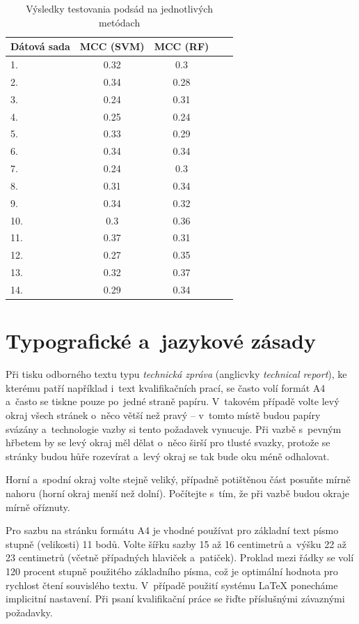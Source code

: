 \begin{table}[H]
	\centering
	\begin{tabular}{ |l | c | c | c | c|}
		\hline 
		Dátová sada  & MCC (SVM) & MCC (RF)  \\ \hline
		1. & 0.32 & 0.3\\ \hline
		2.  & 0.34 & 0.28\\ \hline
		3. & 0.24 & 0.31\\ \hline
		4.  & 0.25 & 0.24\\ \hline
		5.  & 0.33 & 0.29\\ \hline
		6.  & 0.34 & 0.34\\ \hline
		7. & 0.24 & 0.3\\ \hline
		8.  & 0.31 & 0.34\\ \hline
		9.  & 0.34 & 0.32\\ \hline
		10.  & 0.3 & 0.36\\ \hline
		11.  & 0.37 & 0.31\\ \hline
		12.  & 0.27 & 0.35\\ \hline
		13.  & 0.32 & 0.37\\ \hline
		14.  & 0.29 & 0.34\\ \hline
	\end{tabular}
	\caption {Výsledky testovania podsád na jednotlivých metódach} \label{pythontest} 
\end{table} 

\chapter{Typografické a~jazykové zásady}
Při tisku odborného textu typu {\it technická zpráva} (anglicvky {\it technical report}), ke kterému patří například i~text kvalifikačních prací, se často volí formát A4 a~často se tiskne pouze po~jedné straně papíru. V~takovém případě volte levý okraj všech stránek o~něco větší než pravý -- v~tomto místě budou papíry svázány a~technologie vazby si tento požadavek vynucuje. Při vazbě s~pevným hřbetem by se levý okraj měl dělat o~něco širší pro tlusté svazky, protože se stránky budou hůře rozevírat a~levý okraj se tak bude oku méně odhalovat.

Horní a~spodní okraj volte stejně veliký, případně potištěnou část posuňte mírně nahoru (horní okraj menší než dolní). Počítejte s~tím, že při vazbě budou okraje mírně oříznuty.

Pro sazbu na stránku formátu A4 je vhodné používat pro základní text písmo stupně (velikosti) 11 bodů. Volte šířku sazby 15 až 16 centimetrů a~výšku 22 až 23 centimetrů (včetně případných hlaviček a~patiček). Proklad mezi řádky se volí 120 procent stupně použitého základního písma, což je optimální hodnota pro rychlost čtení souvislého textu. V~případě použití systému LaTeX ponecháme implicitní nastavení. Při psaní kvalifikační práce se řiďte příslušnými závaznými požadavky.

